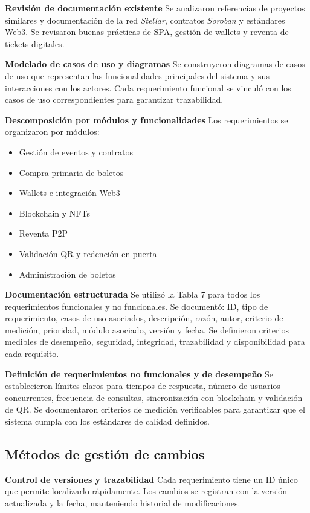 \documentclass[12pt,letterpaper]{article}
\begin{document}
\textbf{Revisión de documentación existente}  
Se analizaron referencias de proyectos similares y documentación de la red
\textit{Stellar}, contratos \textit{Soroban} y estándares Web3. Se revisaron
buenas prácticas de SPA, gestión de wallets y reventa de tickets digitales.

\textbf{Modelado de casos de uso y diagramas}  
Se construyeron diagramas de casos de uso que representan las funcionalidades
principales del sistema y sus interacciones con los actores. Cada requerimiento
funcional se vinculó con los casos de uso correspondientes para garantizar
trazabilidad.

\textbf{Descomposición por módulos y funcionalidades}  
Los requerimientos se organizaron por módulos:
\begin{itemize}
    \item Gestión de eventos y contratos
    \item Compra primaria de boletos
    \item Wallets e integración Web3
    \item Blockchain y NFTs
    \item Reventa P2P
    \item Validación QR y redención en puerta
    \item Administración de boletos
\end{itemize}

\textbf{Documentación estructurada}  
Se utilizó la Tabla 7 para todos los requerimientos funcionales y no funcionales.
Se documentó: ID, tipo de requerimiento, casos de uso asociados, descripción,
razón, autor, criterio de medición, prioridad, módulo asociado, versión y fecha.
Se definieron criterios medibles de desempeño, seguridad, integridad,
trazabilidad y disponibilidad para cada requisito.

\textbf{Definición de requerimientos no funcionales y de desempeño}  
Se establecieron límites claros para tiempos de respuesta, número de usuarios
concurrentes, frecuencia de consultas, sincronización con blockchain y
validación de QR. Se documentaron criterios de medición verificables para
garantizar que el sistema cumpla con los estándares de calidad definidos.

\subsection{Métodos de gestión de cambios}

\textbf{Control de versiones y trazabilidad}  
Cada requerimiento tiene un ID único que permite localizarlo rápidamente.
Los cambios se registran con la versión actualizada y la fecha, manteniendo
historial de modificaciones.
\end{document}
